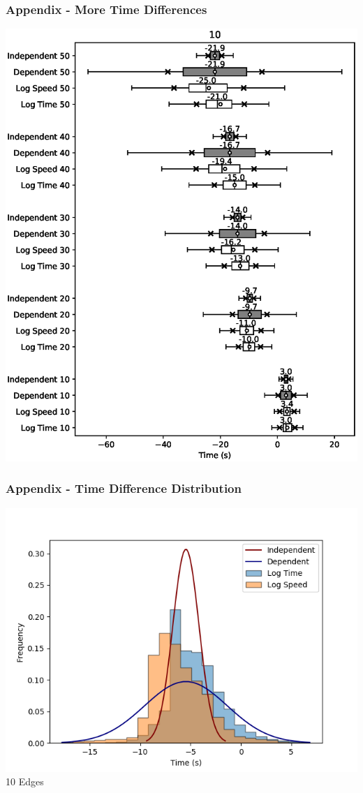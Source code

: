 \documentclass{beamer}
\begin{document}
	\begin{frame}
		\frametitle{Appendix -  More Time Differences}
		\hspace{1.6cm}\includegraphics[height=0.8\textheight]{10.eps}
	\end{frame}
	\begin{frame}
		\frametitle{Appendix -  Time Difference Distribution}
		\includegraphics[width=\textwidth,height=\textheight,keepaspectratio]{DiffDist-8-10.png}
		10 Edges
	\end{frame}
\end{document}

